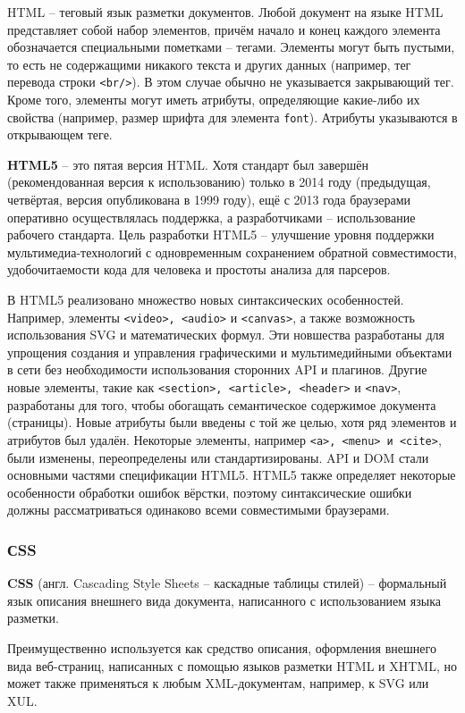 \documentclass[a4paper]{article}
\begin{document}
HTML -- теговый язык разметки документов. Любой документ на языке HTML представляет собой набор элементов, причём начало и конец каждого элемента обозначается специальными пометками -- тегами. Элементы могут быть пустыми, то есть не содержащими никакого текста и других данных (например, тег перевода строки \texttt{<br/>}). В этом случае обычно не указывается закрывающий тег. Кроме того, элементы могут иметь атрибуты, определяющие какие-либо их свойства (например, размер шрифта для элемента \texttt{font}). Атрибуты указываются в открывающем теге.

\textbf{HTML5} -- это пятая версия HTML. Хотя стандарт был завершён (рекомендованная версия к использованию) только в 2014 году (предыдущая, четвёртая, версия опубликована в 1999 году), ещё с 2013 года браузерами оперативно осуществлялась поддержка, а разработчиками -- использование рабочего стандарта. Цель разработки HTML5 -- улучшение уровня поддержки мультимедиа-технологий с одновременным сохранением обратной совместимости, удобочитаемости кода для человека и простоты анализа для парсеров.

В HTML5 реализовано множество новых синтаксических особенностей. Например, элементы \texttt{<video>, <audio>} и \texttt{<canvas>}, а также возможность использования SVG и математических формул. Эти новшества разработаны для упрощения создания и управления графическими и мультимедийными объектами в сети без необходимости использования сторонних API и плагинов. Другие новые элементы, такие как \texttt{<section>, <article>, <header>} и \texttt{<nav>}, разработаны для того, чтобы обогащать семантическое содержимое документа (страницы). Новые атрибуты были введены с той же целью, хотя ряд элементов и атрибутов был удалён. Некоторые элементы, например \texttt{<a>, <menu> и <cite>}, были изменены, переопределены или стандартизированы. API и DOM стали основными частями спецификации HTML5. HTML5 также определяет некоторые особенности обработки ошибок вёрстки, поэтому синтаксические ошибки должны рассматриваться одинаково всеми совместимыми браузерами.

\subsubsection{СSS}

\textbf{CSS} (англ. Cascading Style Sheets -- каскадные таблицы стилей) -- формальный язык описания внешнего вида документа, написанного с использованием языка разметки.

Преимущественно используется как средство описания, оформления внешнего вида веб-страниц, написанных с помощью языков разметки HTML и XHTML, но может также применяться к любым XML-документам, например, к SVG или XUL.
\end{document}

